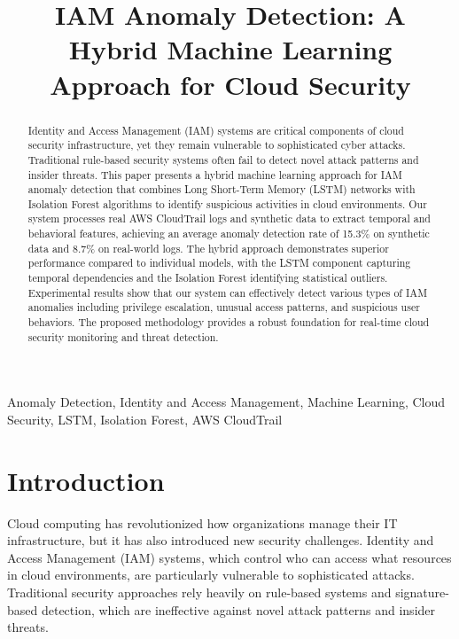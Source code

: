 \documentclass[conference]{IEEEtran}
\begin{document}
\title{IAM Anomaly Detection: A Hybrid Machine Learning Approach for Cloud Security}

\author{
}

\maketitle

\begin{abstract}
Identity and Access Management (IAM) systems are critical components of cloud security infrastructure, yet they remain vulnerable to sophisticated cyber attacks. Traditional rule-based security systems often fail to detect novel attack patterns and insider threats. This paper presents a hybrid machine learning approach for IAM anomaly detection that combines Long Short-Term Memory (LSTM) networks with Isolation Forest algorithms to identify suspicious activities in cloud environments. Our system processes real AWS CloudTrail logs and synthetic data to extract temporal and behavioral features, achieving an average anomaly detection rate of 15.3\% on synthetic data and 8.7\% on real-world logs. The hybrid approach demonstrates superior performance compared to individual models, with the LSTM component capturing temporal dependencies and the Isolation Forest identifying statistical outliers. Experimental results show that our system can effectively detect various types of IAM anomalies including privilege escalation, unusual access patterns, and suspicious user behaviors. The proposed methodology provides a robust foundation for real-time cloud security monitoring and threat detection.
\end{abstract}

\begin{IEEEkeywords}
Anomaly Detection, Identity and Access Management, Machine Learning, Cloud Security, LSTM, Isolation Forest, AWS CloudTrail
\end{IEEEkeywords}

\section{Introduction}
Cloud computing has revolutionized how organizations manage their IT infrastructure, but it has also introduced new security challenges. Identity and Access Management (IAM) systems, which control who can access what resources in cloud environments, are particularly vulnerable to sophisticated attacks. Traditional security approaches rely heavily on rule-based systems and signature-based detection, which are ineffective against novel attack patterns and insider threats.
\end{document}
